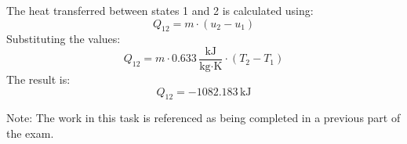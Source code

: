 The heat transferred between states 1 and 2 is calculated using:  
\[
Q_{12} = m \cdot (u_2 - u_1)
\]  
Substituting the values:  
\[
Q_{12} = m \cdot 0.633 \, \frac{\text{kJ}}{\text{kg·K}} \cdot (T_2 - T_1)
\]  
The result is:  
\[
Q_{12} = -1082.183 \, \text{kJ}
\]  

Note: The work in this task is referenced as being completed in a previous part of the exam.